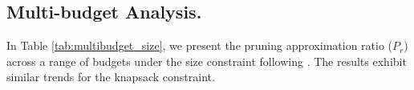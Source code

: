 

\subsection{Multi-budget Analysis.} \label{appendix:multibudget}

In Table \ref{tab:multibudget_size}, we present the pruning approximation ratio ($P_r$) across a range of budgets under the size constraint following \cite{ireland2022lense}. The results exhibit similar trends for the knapsack constraint.

